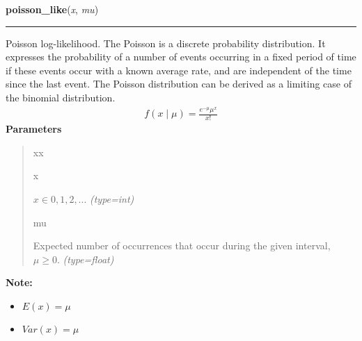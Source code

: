 \hspace{.8\funcindent}\begin{boxedminipage}{\funcwidth}

    \raggedright \textbf{poisson\_like}(\textit{x}, \textit{mu})

    \vspace{-1.5ex}

    \rule{\textwidth}{1pt}
\setlength{\parskip}{2ex}

Poisson log-likelihood. The Poisson is a discrete probability distribution.
It expresses the probability of a number of events occurring in a fixed
period of time if these events occur with a known average rate, and are
independent of the time since the last event. The Poisson distribution can
be derived as a limiting case of the binomial distribution.
\begin{equation*}\begin{split}f(x \mid \mu) = \frac{e^{-\mu}\mu^x}{x!}\end{split}\end{equation*}\setlength{\parskip}{1ex}
      \textbf{Parameters}
      \vspace{-1ex}

      \begin{quote}
        \begin{Ventry}{xx}

          \item[x]


$x \in {0,1,2,...}$
            {\it (type=int)}

          \item[mu]


Expected number of occurrences that occur during the given interval,
$\mu \geq 0$.
            {\it (type=float)}

        \end{Ventry}

      \end{quote}

\textbf{Note:} \begin{itemize}
\item {} 
$E(x)=\mu$

\item {} 
$Var(x)=\mu$

\end{itemize}


    \end{boxedminipage}

    \label{pymc:distributions:skew_normal_like}

